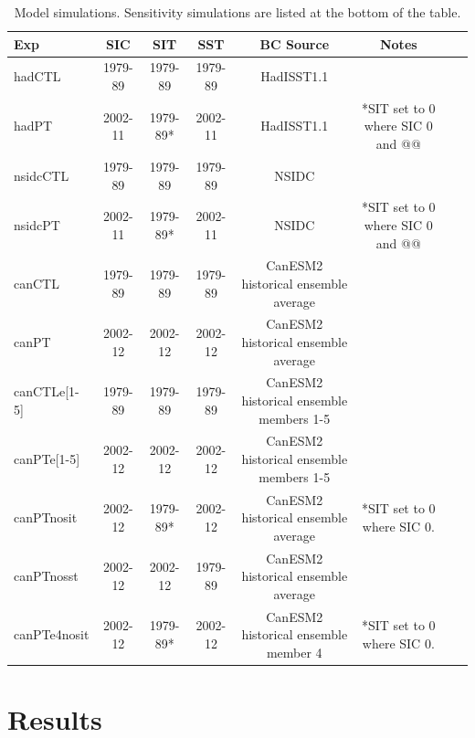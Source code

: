 \documentclass[twocol]{ametsoc}
\begin{document}
\begin{table}[t]
\caption{Model simulations. Sensitivity simulations are listed at the bottom of the table.}\label{simstbl}
\begin{center}
\begin{tabular}{lccccccc}
\hline\hline
Exp & SIC & SIT & SST & BC Source & Notes\\
\hline
 hadCTL & 1979-89 & 1979-89 & 1979-89 & HadISST1.1 \\
 hadPT & 2002-11 & 1979-89* & 2002-11 & HadISST1.1 & *SIT set to 0 where SIC 0 and @@\\
 nsidcCTL & 1979-89 & 1979-89 & 1979-89 & NSIDC \\
 nsidcPT & 2002-11 & 1979-89* & 2002-11 & NSIDC & *SIT set to 0 where SIC 0 and @@\\
 canCTL & 1979-89 & 1979-89 & 1979-89 & CanESM2 historical ensemble average\\
 canPT & 2002-12 & 2002-12 & 2002-12 &  CanESM2 historical ensemble average\\
 canCTLe[1-5] & 1979-89 & 1979-89 & 1979-89  & CanESM2 historical ensemble members 1-5\\
 canPTe[1-5] & 2002-12 & 2002-12 & 2002-12 &  CanESM2 historical ensemble members 1-5\\
 \hline
 \hline
 canPTnosit & 2002-12 & 1979-89* & 2002-12 &  CanESM2 historical ensemble average & *SIT set to 0 where SIC 0. \\
 canPTnosst & 2002-12 & 2002-12 & 1979-89 &  CanESM2 historical ensemble average & \\
 canPTe4nosit  & 2002-12 & 1979-89* & 2002-12 &  CanESM2 historical ensemble member 4 & *SIT set to 0 where SIC 0. \\
\hline
\end{tabular}
\end{center}
\end{table}


\section{Results}
\end{document}
